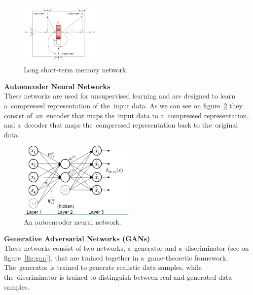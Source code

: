     \begin{center}
        \begin{figure}[!ht]
            \centering
            \includegraphics[width=0.35\textwidth]{figures/ltmn}
            \caption{Long short-term memory network. \cite{cheng2016long}}
            \label{fig:ltmn}
        \end{figure}
    \end{center}
    \textbf{Autoencoder Neural Networks}\\
    These networks are used for unsupervised learning and are designed to learn a~compressed representation of the~input data. As we can see on figure~\ref{fig:ann} they consist of~an~encoder that maps the~input data to a~compressed representation, and a~decoder that maps the~compressed representation back to the~original data.
    \begin{center}
        \begin{figure}[!ht]
            \centering
            \includegraphics[width=0.5\textwidth]{figures/ann}
            \caption{An autoencoder neural network. \cite{luo2018distributed}}
            \label{fig:ann}
        \end{figure}
    \end{center}
    \textbf{Generative Adversarial Networks (GANs)}\\
    These networks consist of two networks, a~generator and a~discriminator (see on figure~\ref{fig:gan}), that are trained together in a~game-theoretic framework. The~generator is trained to generate realistic data samples, while the~discriminator is trained to distinguish between real and generated data samples.

